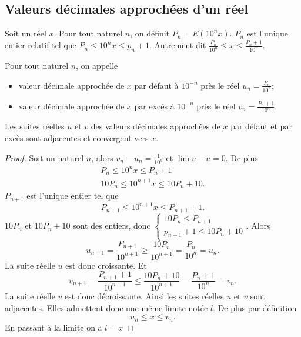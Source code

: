 \subsection{Valeurs décimales approchées d'un réel}

Soit un réel $x$. Pour tout naturel $n$, on définit $P_n=E(10^n x)$. $P_n$ est l'unique entier relatif tel que $P_n \leqslant 10^n x \leqslant p_n+1$. Autrement dit $\frac{P_n}{10^n} \leqslant x \leqslant \frac{P_n+1}{10^n}$.
\begin{defdef}
  Pour tout naturel $n$, on appelle 
  \begin{itemize}
  \item valeur décimale approchée de $x$ par défaut à $10^{-n}$ près le réel $u_n = \frac{P_n}{10^n}$;
  \item valeur décimale approchée de $x$ par excès  à $10^{-n}$ près le réel $v_n = \frac{P_n+1}{10^n}$.
  \end{itemize}
\end{defdef}
\begin{prop}
  Les suites réelles $u$ et $v$ des valeurs décimales approchées de $x$ par défaut et par excès sont adjacentes et convergent vers $x$.
\end{prop}
\begin{proof}
  Soit un naturel $n$, alors $v_n-u_n=\frac{1}{10^n}$ et $\lim v-u=0$. De plus
  \begin{align}
    P_n \leqslant 10^n x \leqslant P_n +1 \\
    10 P_n \leqslant 10^{n+1} x \leqslant 10 P_n +10.
  \end{align}
  $P_{n+1}$ est l'unique entier tel que
  \begin{equation}
    P_{n+1} \leqslant 10^{n+1} x \leqslant P_{n+1}+1.
  \end{equation}
$10P_n$ et $10P_n +10$ sont des entiers, donc $\begin{cases} 10 P_n \leqslant P_{n+1} \\ p_{n+1}+1 \leqslant 10 P_n +10\end{cases}$. Alors 
\begin{equation}
u_{n+1} = \frac{P_{n+1}}{10^{n+1}} \geqslant \frac{10 P_n}{10^{n+1}} = \frac{P_n}{10^n}=u_n.
\end{equation}
 La suite réelle $u$ est donc croissante. Et
\begin{equation}
v_{n+1} = \frac{P_{n+1}+1}{10^{n+1}} \leqslant \frac{10 P_n+10}{10^{n+1}} = \frac{P_n+1}{10^n}= v_n.
\end{equation}
La suite réelle $v$ est donc décroissante. Ainsi les suites réelles $u$ et $v$ sont adjacentes. Elles admettent donc une même limite notée $l$. De plus par définition
\begin{equation}
  u_n \leqslant x \leqslant v_n.
\end{equation}
En passant à la limite on a $l=x$
\end{proof}
